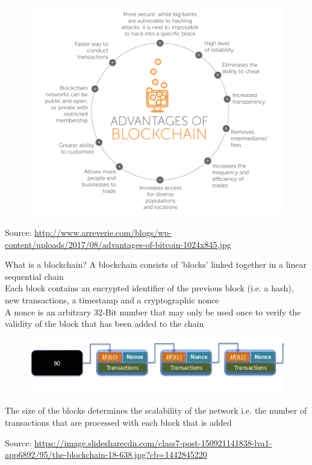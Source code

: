 \documentclass[9pt]{beamer}
\begin{document}
\begin{frame}
	\begin{figure}[]
		\centering
		\includegraphics  [scale=0.15]{Images/advantages}
	\end{figure}
	\begin{tiny}
		Source: \href{http://www.arreverie.com/blogs/blockchain-technology-everything-need-know/advantages-of-bitcoin/}{http://www.arreverie.com/blogs/wp-content/uploads/2017/08/advantages-of-bitcoin-1024x845.jpg}
	\end{tiny}
\end{frame}


\begin{frame}{What is a blockchain?}
	A blockchain consists of 'blocks' linked together in a linear sequential chain\\ \vspace{3mm}
	Each block contains an encrypted identifier of the previous block (i.e. a hash), new transactions, a timestamp and a cryptographic nonce\\ \vspace{3mm}
	A nonce is an arbitrary 32-Bit number that may only be used once to verify the validity of the block that has been added to the chain
	\begin{figure}[]
		\centering
		\includegraphics  [width=3.in]{Images/blockchain1}
	\end{figure}
	The size of the blocks determines the scalability of the network i.e. the number of transactions that are processed with each block that is added
	\begin{tiny}
		Source: \href{https://www.slideshare.net/DavidEvansUVa/the-blockchain}{https://image.slidesharecdn.com/class7-post-150921141838-lva1-app6892/95/the-blockchain-18-638.jpg?cb=1442845220}
	\end{tiny}
\end{frame}
\end{document}

